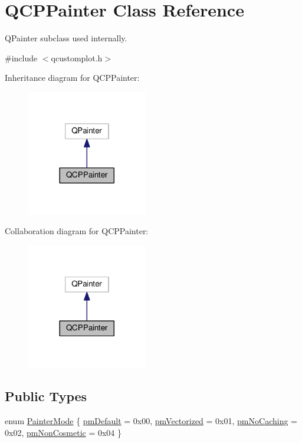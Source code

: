\hypertarget{classQCPPainter}{}\section{Q\+C\+P\+Painter Class Reference}
\label{classQCPPainter}


Q\+Painter subclass used internally.  




{\ttfamily \#include $<$qcustomplot.\+h$>$}



Inheritance diagram for Q\+C\+P\+Painter\+:\nopagebreak
\begin{figure}[H]
\begin{center}
\leavevmode
\includegraphics[width=149pt]{classQCPPainter__inherit__graph}
\end{center}
\end{figure}


Collaboration diagram for Q\+C\+P\+Painter\+:\nopagebreak
\begin{figure}[H]
\begin{center}
\leavevmode
\includegraphics[width=149pt]{classQCPPainter__coll__graph}
\end{center}
\end{figure}
\subsection*{Public Types}
\begin{DoxyCompactItemize}
\item 
enum \hyperlink{classQCPPainter_a156cf16444ff5e0d81a73c615fdb156d}{Painter\+Mode} \{ \hyperlink{classQCPPainter_a156cf16444ff5e0d81a73c615fdb156da3bac5e87e3d58553b297befb4eee2a45}{pm\+Default} = 0x00, 
\hyperlink{classQCPPainter_a156cf16444ff5e0d81a73c615fdb156daeda679cd55dcd468341d07d48a30b6ab}{pm\+Vectorized} = 0x01, 
\hyperlink{classQCPPainter_a156cf16444ff5e0d81a73c615fdb156dae78f9a4eb277a5f9207f50850a51a0b0}{pm\+No\+Caching} = 0x02, 
\hyperlink{classQCPPainter_a156cf16444ff5e0d81a73c615fdb156dac1e481bfaf408f2bd2eaad3ec341f36b}{pm\+Non\+Cosmetic} = 0x04
 \}
\end{DoxyCompactItemize}
